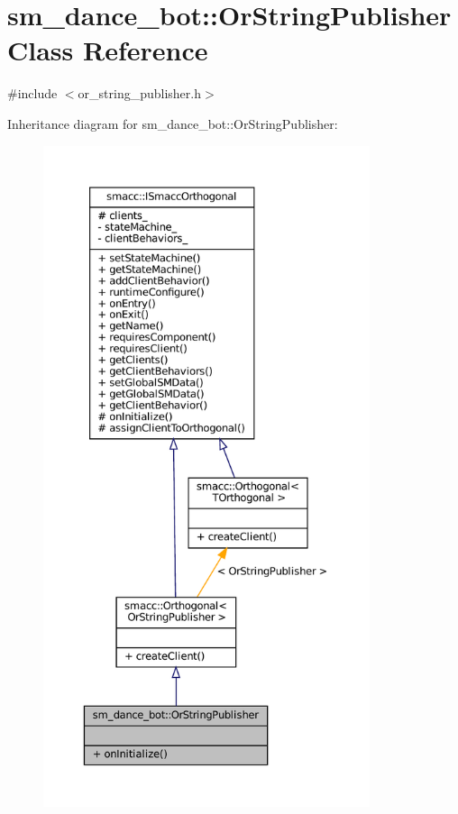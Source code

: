 \hypertarget{classsm__dance__bot_1_1OrStringPublisher}{}\section{sm\+\_\+dance\+\_\+bot\+:\+:Or\+String\+Publisher Class Reference}
\label{classsm__dance__bot_1_1OrStringPublisher}


{\ttfamily \#include $<$or\+\_\+string\+\_\+publisher.\+h$>$}



Inheritance diagram for sm\+\_\+dance\+\_\+bot\+:\+:Or\+String\+Publisher\+:
\nopagebreak
\begin{figure}[H]
\begin{center}
\leavevmode
\includegraphics[height=550pt]{classsm__dance__bot_1_1OrStringPublisher__inherit__graph}
\end{center}
\end{figure}


